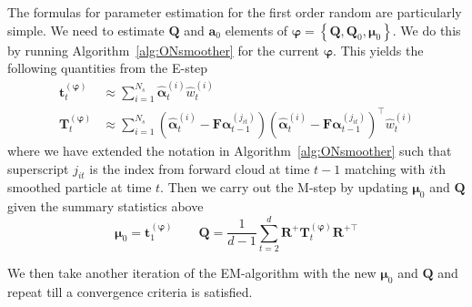 \documentclass[notitlepage]{article}
\renewcommand{\vec}[1]{\bm{#1}}
\newcommand{\mat}[1]{\mathbf{#1}}
\newcommand{\Lbrace}[1]{\left\{ #1\right\}}
\newcommand{\Lparen}[1]{\left( #1\right)}
\newcommand{\partic}[3]{#1_{#2}^{\Lparen{#3}}}
\newcommand{\particS}[3]{\widehat{#1}_{#2}^{\Lparen{#3}}}
\newcommand{\nPart}{N}
\newcommand{\nPeriods}{d}
\begin{document}
The formulas for parameter estimation for the first order random are particularly simple. We need to estimate $\mat{Q}$ and $\vec{a}_0$ elements of $\vec{\varphi} = \Lbrace{\mat{Q}, \mat{Q}_0, \vec\mu_0}$. We do this by running Algorithm~\ref{alg:ONsmoother} for the current $\vec{\varphi}$. This yields the following quantities from the E-step%
%
\begin{equation}\begin{split}
\vec{t}_t^{(\vec{\varphi})} &\approx \sum_{i = 1}^{\nPart_s} \particS{\vec{\alpha}}{t}{i} \particS{w}{t}{i} \\
%
\vec{T}_t^{(\vec{\varphi})} & \approx \sum_{i = 1}^{\nPart_s}
	\Lparen{\particS{\vec{\alpha}}{t}{i} - \mat{F}\partic{\vec{\alpha}}{t-1}{j_{it}}}
	\Lparen{\particS{\vec{\alpha}}{t}{i} - \mat{F}\partic{\vec{\alpha}}{t-1}{j_{it}}}^\top
	\particS{w}{t}{i}
\end{split}\end{equation}%
%
%
where  we have extended the notation in Algorithm~\ref{alg:ONsmoother} such that superscript $j_{it}$ is the index from forward cloud at time $t-1$ matching with $i$th smoothed particle at time $t$.
Then we carry out the M-step by updating $\vec\mu_0$ and $\mat{Q}$ given the summary statistics above%
%
\begin{equation}
\vec\mu_0 = \vec{t}_1^{(\vec{\varphi})} \qquad
%
\mat{Q} = \frac{1}{\nPeriods - 1}\sum_{t = 2}^\nPeriods \mat{R}^+\vec{T}_t^{(\vec{\varphi})}\mat{R}^{+\top}
\end{equation}%

We then take another iteration of the EM-algorithm with the new $\vec\mu_0$ and $\mat{Q}$ 
and repeat
till a convergence criteria is satisfied. 
\end{document}

